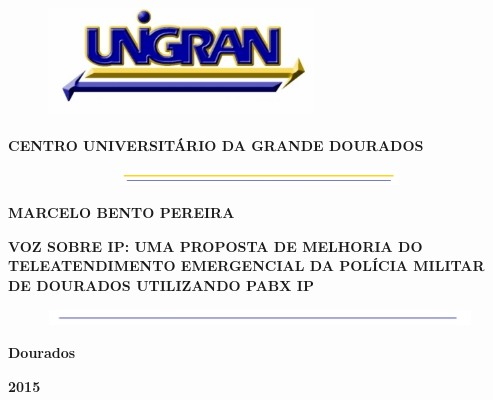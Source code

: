 \begin{center}   %

\begin{figure}[h] %
\centering        %
\includegraphics[width=7.0cm, height=3.0cm]{imagens/UNIGRAN.jpg} %
\end{figure}      %

\textbf{CENTRO UNIVERSITÁRIO DA GRANDE DOURADOS}

\begin{figure}[h]
\centering
\includegraphics[width=15.0cm, height=0.40cm]{imagens/AMARELO.jpg}
\end{figure}

\textbf{MARCELO BENTO PEREIRA} 
\\

\vspace{5cm}%

\textbf{VOZ SOBRE IP: UMA PROPOSTA DE MELHORIA DO TELEATENDIMENTO EMERGENCIAL DA POLÍCIA MILITAR DE DOURADOS UTILIZANDO PABX IP} %

\vspace{10cm}

\begin{figure}[h]
\centering
\includegraphics[width=15.0cm, height=0.40cm]{imagens/AZUL.jpg}

\end{figure}

\textbf{Dourados}
\vspace{-0,5cm} %

\textbf{2015}

\end{center}%
